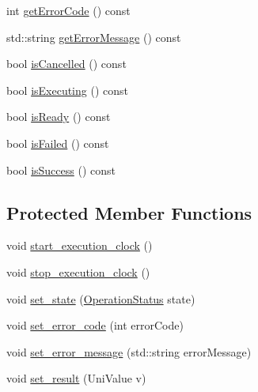 \begin{DoxyCompactItemize}
\item 
int \mbox{\hyperlink{class_async_r_p_c_operation_a74223c143382054f65675dceb4fab777}{get\+Error\+Code}} () const
\item 
std\+::string \mbox{\hyperlink{class_async_r_p_c_operation_a8027a9a3a7b6ebf54f20b4fb93b2e6fe}{get\+Error\+Message}} () const
\item 
bool \mbox{\hyperlink{class_async_r_p_c_operation_ac7b3093bed8fa04841cc618b3517babd}{is\+Cancelled}} () const
\item 
bool \mbox{\hyperlink{class_async_r_p_c_operation_a224b1e5ca0f71103f6a4f1c4344f4be1}{is\+Executing}} () const
\item 
bool \mbox{\hyperlink{class_async_r_p_c_operation_a0e403108f6da6e9a140e42a943586d95}{is\+Ready}} () const
\item 
bool \mbox{\hyperlink{class_async_r_p_c_operation_a236138cd93ff3e6c5869a789edee4b8a}{is\+Failed}} () const
\item 
bool \mbox{\hyperlink{class_async_r_p_c_operation_a657e5de4e0b4d36c5ead2ed225a04744}{is\+Success}} () const
\end{DoxyCompactItemize}
\subsection*{Protected Member Functions}
\begin{DoxyCompactItemize}
\item 
void \mbox{\hyperlink{class_async_r_p_c_operation_a97e645c3dd703f32562fa97a56e33cad}{start\+\_\+execution\+\_\+clock}} ()
\item 
void \mbox{\hyperlink{class_async_r_p_c_operation_a27ebf14d38c4c4c92e8f7718b0f37760}{stop\+\_\+execution\+\_\+clock}} ()
\item 
void \mbox{\hyperlink{class_async_r_p_c_operation_a9c2768bee813eb30ec243f798e95f184}{set\+\_\+state}} (\mbox{\hyperlink{asyncrpcoperation_8h_ac36eba6558c325a3ae9853d551326ff6}{Operation\+Status}} state)
\item 
void \mbox{\hyperlink{class_async_r_p_c_operation_a7744d10ad7a5908165c72a61f3e7de4a}{set\+\_\+error\+\_\+code}} (int error\+Code)
\item 
void \mbox{\hyperlink{class_async_r_p_c_operation_adc6f2696e8fcce11c63e2a0228192ab9}{set\+\_\+error\+\_\+message}} (std\+::string error\+Message)
\item 
void \mbox{\hyperlink{class_async_r_p_c_operation_aee516dfd5a83887995c72a9e0a75fbdd}{set\+\_\+result}} (Uni\+Value v)
\end{DoxyCompactItemize}
